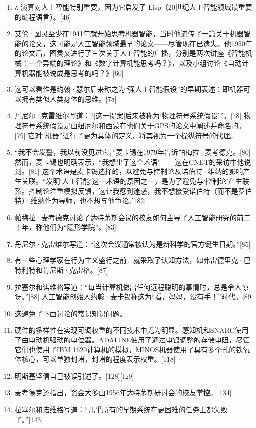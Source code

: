 \begin{enumerate}
\item λ 演算对人工智能特别重要，因为它启发了 Lisp（20世纪人工智能领域最重要的编程语言）。[46]  
\item 艾伦·图灵至少在1941年就开始思考机器智能，当时他流传了一篇关于机器智能的论文，这可能是人工智能领域最早的论文——尽管现在已遗失。他1950年的论文后，图灵又进行了三次关于人工智能的广播，分别是两次讲座《智能机械：一个异端的理论》和《数字计算机能思考吗？》，以及小组讨论《自动计算机器能被说成是思考的吗？》[60]  
\item 这可以看作是约翰·瑟尔后来称之为“强人工智能假设”的早期表述：即机器可以拥有类似人类身体的思维。[78]  
\item 丹尼尔·克雷维尔写道：“[这一提案]后来被称为‘物理符号系统假设’”。[78] 物理符号系统假设是由纽厄尔和西蒙在他们关于GPS的论文中阐述并命名的。[79] 它对“机器”进行了更为具体的定义，将其视为一个操纵符号的代理。  
\item “我不会发誓，我以前没见过它，”麦卡锡在1979年告诉帕梅拉·麦考德克。[80] 然而，麦卡锡也明确表示，“我想出了这个术语”——这在CNET的采访中他说到。[81] 这个术语是麦卡锡选择的，以避免与控制论及诺伯特·维纳的影响产生关联。“发明‘人工智能’这一术语的原因之一，是为了避免与‘控制论’产生联系。控制论注重模拟反馈，这让我感到迷惑，我不想接受诺伯特（而不是罗伯特）·维纳作为导师，也不想与他争论。”[82]  
\item 帕梅拉·麦考德克讨论了达特茅斯会议的校友如何主导了人工智能研究的前二十年，称他们为“隐形学院”。[83]
\item 丹尼尔·克雷维尔写道：“这次会议通常被认为是新科学的官方诞生日期。”[85]  
\item 有一些心理学家在行为主义盛行之前，就采取了认知方法，如弗雷德里克·巴特利特和肯尼斯·克雷格。[87]  
\item 拉塞尔和诺维格写道：“每当计算机做出任何远程聪明的事情时，总是令人惊讶。”[88] 人工智能创始人约翰·麦卡锡称这为“看，妈妈，没有手！”时代。[89]  
\item 这避免了下面讨论的常识知识问题。  
\item 硬件的多样性在实现可调权重的不同技术中尤为明显。感知机和SNARC使用了由电动机驱动的电位器。ADALINE使用了通过电镀调整的存储电阻，尽管它们也使用了IBM 1620计算机的模拟。MINOS机器使用了具有多个孔的铁氧体核心，可以单独封堵，封堵的程度表示权重。[118]  
\item 明斯基坚信自己被误引述了。[128][129]  
\item 麦考德克还指出，资金大多由1956年达特茅斯研讨会的校友掌控。[134]  
\item 拉塞尔和诺维格写道：“几乎所有的早期系统在更困难的任务上都失败了。”[143]  

\end{enumerate}
